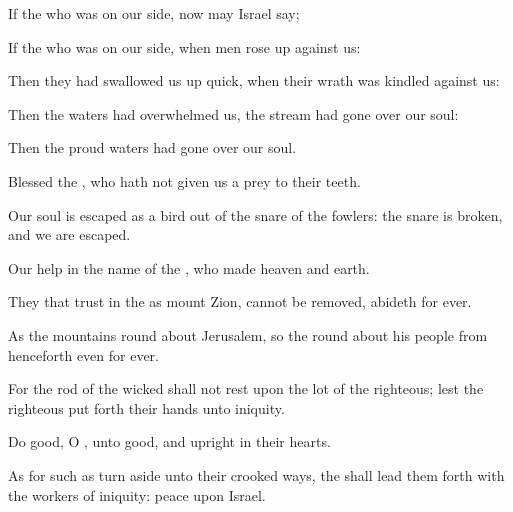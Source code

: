 {\Q {}If
{} the
{} who was on our side, now may
Israel
say;


\par }{\Q {}If
{} the
{} who was on our side, when
men rose
up against us:


\par }{\Q {}Then they had swallowed us
up
quick, when their
wrath was
kindled against us:


\par }{\Q {}Then the
waters had
overwhelmed us, the
stream had gone
over our
soul:


\par }{\Q {}Then the
proud
waters had gone
over our
soul.


\par }{\BB \par }
{\Q {}Blessed
{} the
{}, who hath not
given us
{} a
prey to their
teeth.


\par }{\Q {}Our
soul is
escaped as a
bird out of the
snare of the
fowlers: the
snare is
broken, and we are
escaped.


\par }{\Q {}Our
help
{} in the
name of the
{}, who
made
heaven and
earth.




\par }
{\Q {}They that
trust in the
{}
{} as
mount
Zion,
{} cannot be
removed,
{}
abideth for
ever.


\par }{\Q {}As the
mountains
{} round
about
Jerusalem, so the
{}
{} round
about his
people from henceforth even
for
ever.


\par }{\Q {}For the
rod of the
wicked shall not
rest upon the
lot of the
righteous;
lest the
righteous put
forth their
hands unto
iniquity.


\par }{\BB \par }
{\Q {}Do
good, O
{}, unto
{}
good, and
{}
upright in their
hearts.


\par }{\Q {}As for such as turn
aside unto their crooked
ways, the
{} shall lead them
forth with the
workers of
iniquity:
{}
peace
{} upon
Israel.




\par }

